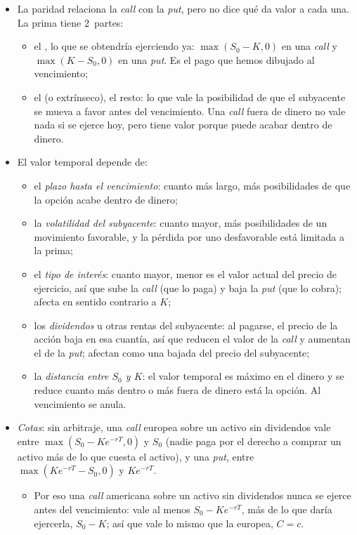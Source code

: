 \documentclass[11pt]{article}
\begin{document}
\begin{itemize}
\item La paridad relaciona la \emph{call} con la \emph{put}, pero no dice qué da valor a cada una. La prima tiene 2~partes:
  \begin{itemize}
  \item el , lo que se obtendría ejerciendo ya: $\max(S_0-K,0)$ en una \emph{call} y $\max(K-S_0,0)$ en una \emph{put}. Es el pago que hemos dibujado al vencimiento;
  \item el  (o extrínseco), el resto: lo que vale la posibilidad de que el subyacente se mueva a favor antes del vencimiento. Una \emph{call} fuera de dinero no vale nada si se ejerce hoy, pero tiene valor porque puede acabar dentro de dinero.
  \end{itemize}
\item El valor temporal depende de:
  \begin{itemize}
  \item el \emph{plazo hasta el vencimiento}: cuanto más largo, más posibilidades de que la opción acabe dentro de dinero;
  \item la \emph{volatilidad del subyacente}: cuanto mayor, más posibilidades de un movimiento favorable, y la pérdida por uno desfavorable está limitada a la prima;
  \item el \emph{tipo de interés}: cuanto mayor, menor es el valor actual del precio de ejercicio, así que sube la \emph{call} (que lo paga) y baja la \emph{put} (que lo cobra); afecta en sentido contrario a $K$;
  \item los \emph{dividendos} u otras rentas del subyacente: al pagarse, el precio de la acción baja en esa cuantía, así que reducen el valor de la \emph{call} y aumentan el de la \emph{put}; afectan como una bajada del precio del subyacente;
  \item la \emph{distancia entre $S_0$ y $K$}: el valor temporal es máximo en el dinero y se reduce cuanto más dentro o más fuera de dinero está la opción. Al vencimiento se anula.
  \end{itemize}
\item \emph{Cotas}: sin arbitraje, una \emph{call} europea sobre un activo sin dividendos vale entre $\max(S_0-Ke^{-rT},0)$ y $S_0$ (nadie paga por el derecho a comprar un activo más de lo que cuesta el activo), y una \emph{put}, entre $\max(Ke^{-rT}-S_0,0)$ y $Ke^{-rT}$.
  \begin{itemize}
  \item Por eso una \emph{call} americana sobre un activo sin dividendos nunca se ejerce antes del vencimiento: vale al menos $S_0-Ke^{-rT}$, más de lo que daría ejercerla, $S_0-K$; así que vale lo mismo que la europea, $C=c$\nocite{Merton1973Theory}.

\end{itemize}
\end{itemize}
\end{document}
